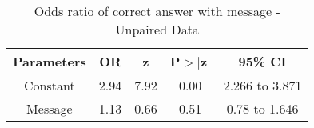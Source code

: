 \begin{table}[htbp]
\centering
\caption{Odds ratio of correct answer with message - Unpaired Data} 
\label{ormesgup}
\begin{tabular}{ccccc}
  \toprule
Parameters & OR & z & P$>$$|$z$|$ & 95\% CI \\ 
  \midrule
Constant & 2.94 & 7.92 & 0.00 & 2.266 to 3.871 \\ 
  Message & 1.13 & 0.66 & 0.51 & 0.78 to 1.646 \\ 
   \bottomrule
\end{tabular}
\end{table}
